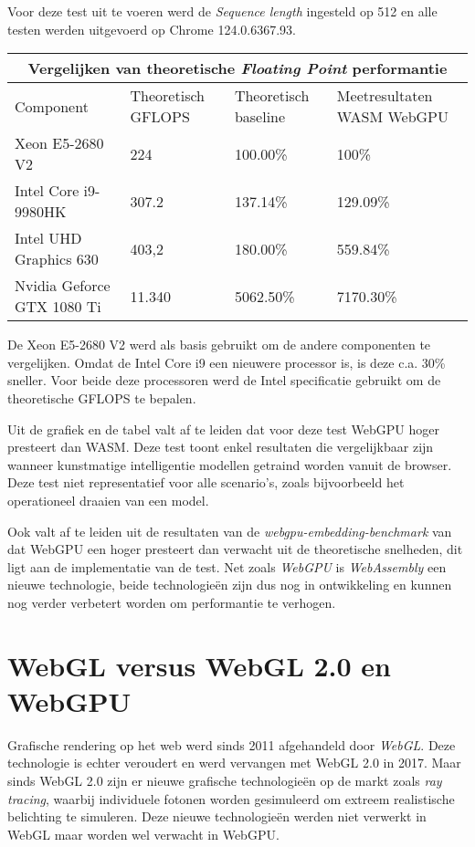 \bigbreak{}

Voor deze test uit te voeren werd de \textit{Sequence length} ingesteld op 512 en alle testen werden uitgevoerd op Chrome 124.0.6367.93.

\break{}

\begin{tabular}{ |p{5cm}|p{3cm}|p{3cm}|p{3cm}|  }
    \hline
    \multicolumn{4}{|c|}{Vergelijken van theoretische \textit{Floating Point} performantie} \\
    \hline
    Component& Theoretisch GFLOPS & Theoretisch baseline & Meetresultaten WASM WebGPU\\
    \hline
        Xeon E5-2680 V2             & 224       & 100.00\%  & 100\%       \\
        Intel Core i9-9980HK        & 307.2     & 137.14\%  & 129.09\%    \\
        Intel UHD Graphics 630      & 403,2     & 180.00\%  & 559.84\%    \\
        Nvidia Geforce GTX 1080 Ti  & 11.340    & 5062.50\% & 7170.30\%   \\
    \hline
\end{tabular}

\bigbreak{}

De Xeon E5-2680 V2 werd als basis gebruikt om de andere componenten te vergelijken. Omdat de Intel Core i9 een nieuwere processor is, is deze c.a. 30\% sneller. Voor beide deze processoren werd de Intel specificatie gebruikt om de theoretische GFLOPS te bepalen. \autocite{Intel2024, Intel2024a}

\bigbreak{}

Uit de grafiek en de tabel valt af te leiden dat voor deze test WebGPU hoger presteert dan WASM. Deze test toont enkel resultaten die vergelijkbaar zijn wanneer kunstmatige intelligentie modellen getraind worden vanuit de browser. Deze test niet representatief voor alle scenario's, zoals bijvoorbeeld het operationeel draaien van een model.

\bigbreak{}

Ook valt af te leiden uit de resultaten van de \textit{webgpu-embedding-benchmark} van \textcite{Lochner2024} dat WebGPU een hoger presteert dan verwacht uit de theoretische snelheden, dit ligt aan de implementatie van de test. Net zoals \textit{WebGPU} is \textit{WebAssembly} een nieuwe technologie, beide technologieën zijn dus nog in ontwikkeling en kunnen nog verder verbetert worden om performantie te verhogen.

\section{WebGL versus WebGL 2.0 en WebGPU}

Grafische rendering op het web werd sinds 2011 afgehandeld door \textit{WebGL}. Deze technologie is echter veroudert en werd vervangen met WebGL 2.0 in 2017. Maar sinds WebGL 2.0 zijn er nieuwe grafische technologieën op de markt zoals \textit{ray tracing}, waarbij individuele fotonen worden gesimuleerd om extreem realistische belichting te simuleren. Deze nieuwe technologieën werden niet verwerkt in WebGL maar worden wel verwacht in WebGPU.